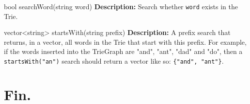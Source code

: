 \documentclass[11pt]{article}
\newcommand{\code}[1]{\texttt{#1}}
\begin{document}
\begin{methodbox}{bool searchWord(string word)}
\textbf{Description:} Search whether \code{word} exists in the Trie.
\end{methodbox}

\begin{methodbox}{vector<string> startsWith(string prefix)}
\textbf{Description:} A prefix search that returns, in a vector, all words in the Trie that start with this prefix. For example, if the words inserted into the TrieGraph are "and", "ant", "dad" and "do", then a \code{startsWith("an")} search should return a vector like so: \code{\{"and", "ant"\}}.
\end{methodbox}

\newpage

\section{Fin.}
\end{document}

